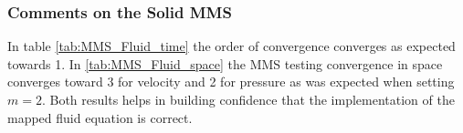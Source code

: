 \subsubsection*{Comments on the Solid MMS}
In table \ref{tab:MMS_Fluid_time} the order of convergence converges as expected towards 1. In \ref{tab:MMS_Fluid_space} the MMS testing convergence in space converges toward 3 for velocity and 2 for pressure as was expected when setting $m=2$. Both results helps in building confidence that the implementation of the mapped fluid equation is correct.





